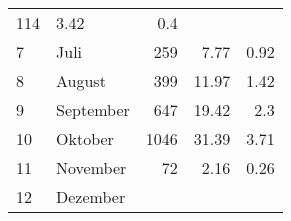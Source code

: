 \begin{longtable}{lXrrr}
       \num{114} &
       \num[round-mode=places,round-precision=2]{3.42} &
         \num[round-mode=places,round-precision=2]{0.4} \\

     7 &
     \multicolumn{1}{X}{ Juli   } &


       \num{259} &
       \num[round-mode=places,round-precision=2]{7.77} &
         \num[round-mode=places,round-precision=2]{0.92} \\

     8 &
     \multicolumn{1}{X}{ August   } &


       \num{399} &
       \num[round-mode=places,round-precision=2]{11.97} &
         \num[round-mode=places,round-precision=2]{1.42} \\

     9 &
     \multicolumn{1}{X}{ September   } &


       \num{647} &
       \num[round-mode=places,round-precision=2]{19.42} &
         \num[round-mode=places,round-precision=2]{2.3} \\

     10 &
     \multicolumn{1}{X}{ Oktober   } &


       \num{1046} &
       \num[round-mode=places,round-precision=2]{31.39} &
         \num[round-mode=places,round-precision=2]{3.71} \\

     11 &
     \multicolumn{1}{X}{ November   } &


       \num{72} &
       \num[round-mode=places,round-precision=2]{2.16} &
         \num[round-mode=places,round-precision=2]{0.26} \\

     12 &
     \multicolumn{1}{X}{ Dezember   } &



\end{longtable}
